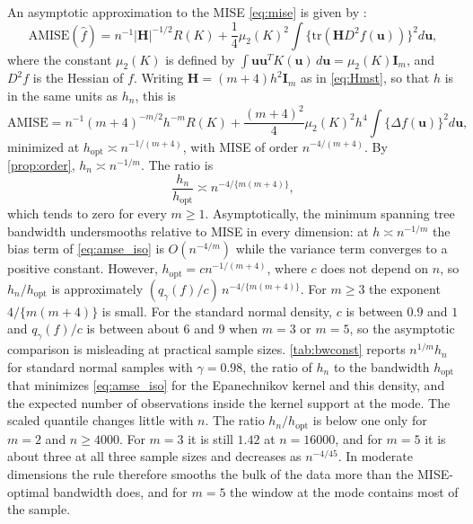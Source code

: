 An asymptotic approximation to the MISE \eqref{eq:mise} is given by \citet{chacon2018multivariate}:
\begin{equation}\label{eq:amse}
  \text{AMISE}(\hat{f}) = n^{-1}|\bm{H}|^{-1/2} R(K) + \frac{1}{4} \mu_2(K)^2 \int \big\{\text{tr}(\bm{H} D^2 f(\bm{u}))\big\}^2 d\bm{u},
\end{equation}
where the constant $\mu_2(K)$ is defined by $\int \bm{u}\bm{u}^T K(\bm{u})\,d\bm{u} = \mu_2(K)\bm{I}_m$, and $D^2 f$ is the Hessian of $f$. Writing $\bm{H}=(m+4)h^2\bm{I}_m$ as in \eqref{eq:Hmst}, so that $h$ is in the same units as $h_n$, this is
\begin{equation}\label{eq:amse_iso}
  \text{AMISE} = n^{-1} (m+4)^{-m/2} h^{-m} R(K) + \frac{(m+4)^2}{4} \mu_2(K)^2 h^4 \int \big\{\Delta f(\bm{u})\big\}^2 d\bm{u},
\end{equation}
minimized at $h_{\text{opt}} \asymp n^{-1/(m+4)}$, with MISE of order $n^{-4/(m+4)}$. By \cref{prop:order}, $h_n \asymp n^{-1/m}$. The ratio is
$$
\frac{h_n}{h_{\text{opt}}} \asymp n^{-4/\{m(m+4)\}},
$$
which tends to zero for every $m\geq1$. Asymptotically, the minimum spanning tree bandwidth undersmooths relative to MISE in every dimension: at $h\asymp n^{-1/m}$ the bias term of \eqref{eq:amse_iso} is $O(n^{-4/m})$ while the variance term converges to a positive constant. However, $h_{\text{opt}}=cn^{-1/(m+4)}$, where $c$ does not depend on $n$, so $h_n/h_{\text{opt}}$ is approximately $(q_\gamma(f)/c)\,n^{-4/\{m(m+4)\}}$. For $m\ge3$ the exponent $4/\{m(m+4)\}$ is small. For the standard normal density, $c$ is between $0.9$ and $1$ and $q_\gamma(f)/c$ is between about $6$ and $9$ when $m=3$ or $m=5$, so the asymptotic comparison is misleading at practical sample sizes. \cref{tab:bwconst} reports $n^{1/m}h_n$ for standard normal samples with $\gamma=0.98$, the ratio of $h_n$ to the bandwidth $h_{\text{opt}}$ that minimizes \eqref{eq:amse_iso} for the Epanechnikov kernel and this density, and the expected number of observations inside the kernel support at the mode. The scaled quantile changes little with $n$. The ratio $h_n/h_{\text{opt}}$ is below one only for $m=2$ and $n\ge4000$. For $m=3$ it is still $1.42$ at $n=16000$, and for $m=5$ it is about three at all three sample sizes and decreases as $n^{-4/45}$. In moderate dimensions the rule therefore smooths the bulk of the data more than the MISE-optimal bandwidth does, and for $m=5$ the window at the mode contains most of the sample.

\begin{table}[!ht]
  \centering
  \caption{The minimum spanning tree bandwidth for standard normal samples in $\R^m$ with $\gamma=0.98$, averaged over ten samples. $h_{\text{opt}}$ minimizes the AMISE \eqref{eq:amse_iso} for the Epanechnikov kernel and this density. The last column is the expected number of observations inside the kernel support at the mode, $n\,\P(\|\bm{Y}\|\le\sqrt{m+4}\,h_n)$.}
  \label{tab:bwconst}
  
\end{table}


